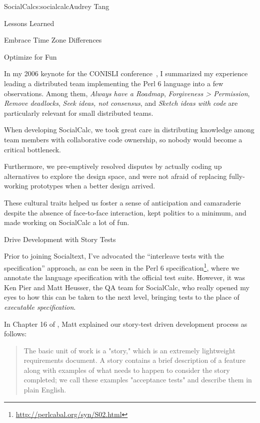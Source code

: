 \begin{aosachapter}{SocialCalc}{s:socialcalc}{Audrey Tang}
\begin{aosasect1}{Lessons Learned}
\begin{aosasect2}{Embrace Time Zone Differences}
\end{aosasect2}

\begin{aosasect2}{Optimize for Fun}

In my 2006 keynote for the CONISLI conference~\cite{bib:tang:fun}, I
summarized my experience leading a distributed team implementing the
Perl 6 language into a few observations.  Among them, \emph{Always
 have a Roadmap}, \emph{Forgiveness {\textgreater} Permission},
\emph{Remove deadlocks}, \emph{Seek ideas, not consensus}, and
\emph{Sketch ideas with code} are particularly relevant for small
distributed teams.

When developing SocialCalc, we took great care in distributing
knowledge among team members with collaborative code ownership, so
nobody would become a critical bottleneck.

Furthermore, we pre-emptively resolved disputes by actually coding up
alternatives to explore the design space, and were not afraid of
replacing fully-working prototypes when a better design arrived.

These cultural traits helped us foster a sense of anticipation and
camaraderie despite the absence of face-to-face interaction, kept
politics to a minimum, and made working on SocialCalc a lot of fun.

\end{aosasect2}

\begin{aosasect2}{Drive Development with Story Tests}

Prior to joining Socialtext, I've advocated the ``interleave tests
with the specification'' approach, as can be seen in the Perl 6
specification\footnote{\url{http://perlcabal.org/syn/S02.html}}, where
we annotate the language specification with the official test suite.
However, it was Ken Pier and Matt Heusser, the QA team for SocialCalc,
who really opened my eyes to how this can be taken to the next level,
bringing tests to the place of \emph{executable specification}.


In Chapter 16 of \cite{bib:goucher:test}, Matt explained our
story-test driven development process as follows:

\begin{quotation}

  The basic unit of work is a "story," which is an extremely
  lightweight requirements document. A story contains a brief
  description of a feature along with examples of what needs to happen
  to consider the story completed; we call these examples "acceptance
  tests" and describe them in plain English.


\end{quotation}
\end{aosasect2}
\end{aosasect1}
\end{aosachapter}

